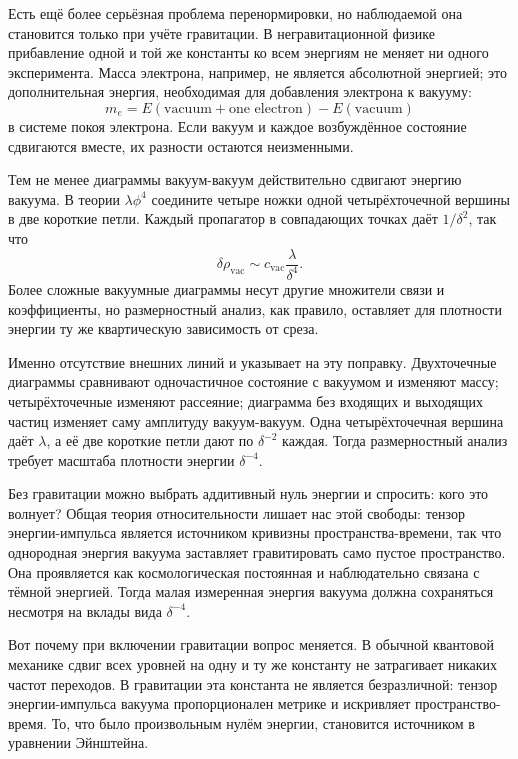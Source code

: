 Есть ещё более серьёзная проблема перенормировки, но наблюдаемой она становится только при учёте гравитации. В негравитационной физике прибавление одной и той же константы ко всем энергиям не меняет ни одного эксперимента. Масса электрона, например, не является абсолютной энергией; это дополнительная энергия, необходимая для добавления электрона к вакууму:
\begin{equation}
m_e=E(\text{vacuum}+\text{one electron})-E(\text{vacuum})
\end{equation}
в системе покоя электрона. Если вакуум и каждое возбуждённое состояние сдвигаются вместе, их разности остаются неизменными.

Тем не менее диаграммы вакуум-вакуум действительно сдвигают энергию вакуума. В теории \(\lambda\phi^4\) соедините четыре ножки одной четырёхточечной вершины в две короткие петли. Каждый пропагатор в совпадающих точках даёт \(1/\delta^2\), так что
\begin{equation}
\delta\rho_{\mathrm{vac}}
\sim
c_{\mathrm{vac}}\frac{\lambda}{\delta^4}.
\label{eq:vacuum-energy-divergence}
\end{equation}
Более сложные вакуумные диаграммы несут другие множители связи и коэффициенты, но размерностный анализ, как правило, оставляет для плотности энергии ту же квартическую зависимость от среза.

Именно отсутствие внешних линий и указывает на эту поправку. Двухточечные диаграммы сравнивают одночастичное состояние с вакуумом и изменяют массу; четырёхточечные изменяют рассеяние; диаграмма без входящих и выходящих частиц изменяет саму амплитуду вакуум-вакуум. Одна четырёхточечная вершина даёт \(\lambda\), а её две короткие петли дают по \(\delta^{-2}\) каждая. Тогда размерностный анализ требует масштаба плотности энергии \(\delta^{-4}\).

Без гравитации можно выбрать аддитивный нуль энергии и спросить: кого это волнует? Общая теория относительности лишает нас этой свободы: тензор энергии-импульса является источником кривизны пространства-времени, так что однородная энергия вакуума заставляет гравитировать само пустое пространство. Она проявляется как космологическая постоянная и наблюдательно связана с тёмной энергией. Тогда малая измеренная энергия вакуума должна сохраняться несмотря на вклады вида \(\delta^{-4}\).

Вот почему при включении гравитации вопрос меняется. В обычной квантовой механике сдвиг всех уровней на одну и ту же константу не затрагивает никаких частот переходов. В гравитации эта константа не является безразличной: тензор энергии-импульса вакуума пропорционален метрике и искривляет пространство-время. То, что было произвольным нулём энергии, становится источником в уравнении Эйнштейна.

